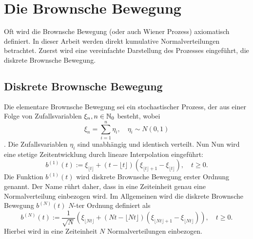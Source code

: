 \section{Die Brownsche Bewegung}

Oft wird die Brownsche Bewegung (oder auch Wiener Prozess) axiomatisch definiert. In dieser Arbeit werden 
direkt kumulative Normalverteilungen betrachtet. Zuerst wird eine vereinfachte Darstellung des Prozesses eingeführt, 
die diskrete Brownsche Bewegung.

\subsection{Diskrete Brownsche Bewegung}

\begin{defi}
Die elementare Brownsche Bewegung sei ein stochastischer Prozess, 
der aus einer Folge von Zufallsvariablen $\xi_n, n \in \Bbb N_0$ besteht, wobei
$$\xi_n = \sum_{i=1}^n \eta_i, \quad \eta_i \sim N(0,1)$$. 
Die Zufallsvariablen $\eta_i$ sind unabhängig und identisch verteilt. Nun 
Nun wird eine stetige Zeitentwicklung durch lineare Interpolation eingeführt:
$$b^{(1)}(t) := \xi_{\lfloor t \rfloor} + (t - \lfloor t \rfloor)(\xi_{\lfloor t \rfloor + 1} - \xi_{\lfloor t \rfloor}), \quad t \geq 0.$$
Die Funktion $b^{(1)}(t)$ wird diskrete Brownsche Bewegung erster Ordnung genannt.
Der Name rührt daher, dass in eine Zeiteinheit genau eine Normalverteilung einbezogen wird.
Im Allgemeinen wird die diskrete Brownsche Bewegung $b^{(N)}(t)$ $N$-ter Ordnung definiert als
$$b^{(N)}(t) := \frac{1}{\sqrt{N}} \left ( \xi_{\lfloor Nt \rfloor} + (Nt - \lfloor Nt \rfloor)(\xi_{\lfloor Nt \rfloor + 1} - \xi_{\lfloor Nt \rfloor}) \right ), \quad t \geq 0.$$
Hierbei wird in eine Zeiteinheit $N$ Normalverteilungen einbezogen.

\end{defi}

